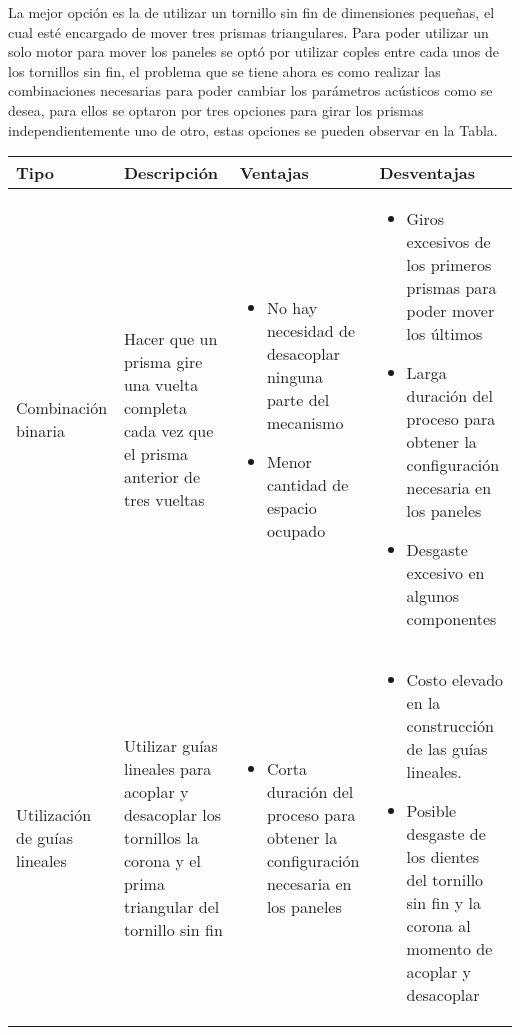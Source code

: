 La mejor opción es la de utilizar un tornillo sin fin de dimensiones pequeñas, el cual esté encargado de mover tres prismas triangulares. Para poder utilizar un solo motor para mover los paneles se optó por utilizar coples entre cada unos de los tornillos sin fin, el problema que se tiene ahora es como realizar las combinaciones necesarias para poder cambiar los parámetros acústicos como se desea, para ellos se optaron por tres opciones para girar los prismas independientemente uno de otro, estas opciones se pueden observar en la Tabla.
\begin{center}
\footnotesize
    \begin{longtable}[!htb]{| m{7em} | m{10em} | m{12em}| m{12em}|}
    \hline
    \textbf{Tipo}& \textbf{Descripción} & \textbf{Ventajas} & \textbf{Desventajas}\\
    \hline\hline
    Combinación binaria & Hacer que un prisma gire una vuelta completa cada vez que el prisma anterior de tres vueltas  &
    \begin{itemize}
        \item No hay necesidad de desacoplar ninguna parte del mecanismo
        \item Menor cantidad de espacio ocupado
    \end{itemize}
    & 
    \begin{itemize}
        \item Giros excesivos de los primeros prismas para poder mover los últimos
        \item Larga duración del proceso para obtener la configuración necesaria en los paneles
        \item Desgaste excesivo en algunos componentes
    \end{itemize}\\
    \hline
    Utilización de guías lineales & Utilizar guías lineales para acoplar y desacoplar los tornillos la corona y el prima triangular del tornillo sin fin &
    \begin{itemize}
        \item Corta duración del proceso para obtener la configuración necesaria en los paneles
    \end{itemize}
    & 
    \begin{itemize}
        \item Costo elevado en la construcción de las guías lineales.
        \item Posible desgaste de los dientes del tornillo sin fin y la corona al momento de acoplar y desacoplar

\end{itemize}
\end{longtable}
\end{center}
